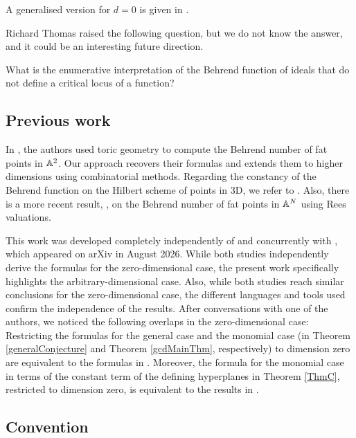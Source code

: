 \documentclass[11pt,a4paper,leqno,noamsfonts]{amsart}
\numberwithin{equation}{section}
\begin{document}
\begin{remark}
    A generalised version for $d=0$ is given in \cite{Si}.
\end{remark}


Richard Thomas raised the following question, but we do not know the answer, and it could be an interesting future direction.
\begin{question*}
    What is the enumerative interpretation of the Behrend function of ideals that do not define a critical locus of a function?
\end{question*}

\subsection*{Previous work} In \cite{Graffeo-Ricolfi}, the authors used toric geometry to compute the Behrend number of fat points in ${\mathbb{A}}^2$. Our approach recovers their formulas and extends them to higher dimensions using combinatorial methods. Regarding the constancy of the Behrend function on the Hilbert scheme of points in 3D, we refer to \cite{JKSCounterBehrend}. Also, there is a more recent result, \cite{PSU26}, on the Behrend number of fat points in ${\mathbb{A}}^N$ using Rees valuations.

\begin{remark}
    This work was developed completely independently of and concurrently with \cite{PSU26}, which appeared on arXiv in August 2026. While both studies independently derive the formulas for the zero-dimensional case, the present work specifically highlights the arbitrary-dimensional case. Also, while both studies reach similar conclusions for the zero-dimensional case, the different languages and tools used confirm the independence of the results.  After conversations with one of the authors, we noticed the following overlaps in the zero-dimensional case: Restricting the formulas for the general case and the monomial case (in Theorem  \ref{generalConjecture} and Theorem \ref{gcdMainThm}, respectively) to dimension zero are equivalent to the formulas in \cite{PSU26}. Moreover,  the formula for the monomial case in terms of the constant term of the defining hyperplanes in Theorem \ref{ThmC}, restricted to dimension zero, is equivalent to the results in \cite{PSU26}. 

\end{remark} 






 \subsection*{Convention}  
 
\end{document}
